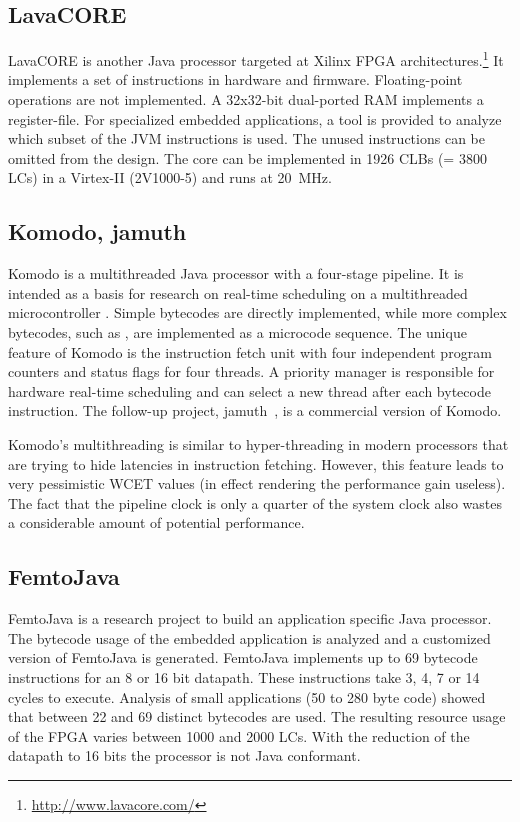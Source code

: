 \subsection{LavaCORE}

LavaCORE \cite{LavaCORE} is another Java processor targeted at Xilinx
FPGA architectures.\footnote{\url{http://www.lavacore.com/}} It
implements a set of instructions in hardware and firmware.
Floating-point operations are not implemented. A 32x32-bit
dual-ported RAM implements a register-file. For specialized embedded
applications, a tool is provided to analyze which subset of the JVM
instructions is used. The unused instructions can be omitted from the
design. The core can be implemented in 1926 CLBs (= 3800 LCs) in a
Virtex-II (2V1000-5) and runs at 20~MHz.

\subsection{Komodo, jamuth}  
\label{subsec:related:komodo}

Komodo \cite{Zulauf00} is a multithreaded Java processor with a
four-stage pipeline. It is intended as a basis for research on
real-time scheduling on a multithreaded microcontroller
\cite{komodo2003}. Simple bytecodes are directly implemented, while
more complex bytecodes, such as , are implemented as a
microcode sequence. The unique feature of Komodo is the instruction
fetch unit with four independent program counters and status flags
for four threads. A priority manager is responsible for hardware
real-time scheduling and can select a new thread after each bytecode
instruction. The follow-up project, jamuth~\cite{jamuth:jtres07}, is
a commercial version of Komodo.

Komodo's multithreading is similar to hyper-threading in modern
processors that are trying to hide latencies in instruction fetching.
However, this feature leads to very pessimistic WCET values (in
effect rendering the performance gain useless). The fact that the
pipeline clock is only a quarter of the system clock also wastes a
considerable amount of potential performance.

\subsection{FemtoJava} 

FemtoJava \cite{Femto01} is a research project to build an
application specific Java processor. The bytecode usage of the
embedded application is analyzed and a customized version of
FemtoJava is generated. FemtoJava implements up to 69 bytecode
instructions for an 8 or 16 bit datapath. These instructions take 3,
4, 7 or 14 cycles to execute. Analysis of small applications (50 to
280 byte code) showed that between 22 and 69 distinct bytecodes are
used. The resulting resource usage of the FPGA varies between 1000
and 2000 LCs. With the reduction of the datapath to 16 bits the
processor is not Java conformant.

